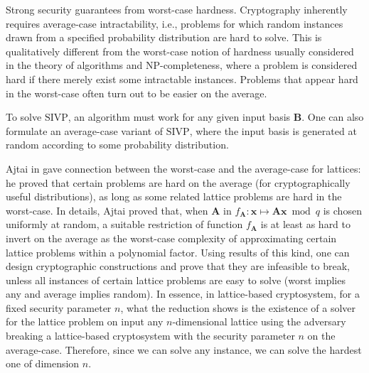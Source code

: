 Strong security guarantees from worst-case hardness. Cryptography inherently requires average-case intractability, i.e., problems for which random instances drawn from a specified probability distribution are hard to solve. This is qualitatively different from the worst-case notion of hardness usually considered in the theory of algorithms and NP-completeness, where a problem is considered hard if there merely exist some intractable instances. Problems that appear hard in the worst-case often turn out to be easier on the average.


\begin{plain}
\normalfont
To solve $\mathrm{SIVP}$, an algorithm must work for any given input basis $\textbf{B}$. One can also formulate an average-case variant of $\mathrm{SIVP}$, where the input basis is generated at random according to some probability distribution.
\end{plain}










Ajtai in \cite{ajtai1996generating} gave connection between the worst-case and the average-case for lattices: he proved that certain problems are hard on the average (for cryptographically useful distributions), as long as some related lattice problems are hard in the worst-case. In details, Ajtai proved that, when $\textbf{A}$ in $f_\textbf{A}:\textbf{x} \mapsto \textbf{A}\textbf{x} \bmod q$ is chosen uniformly at random, a suitable restriction of function $f_\textbf{A}$ is at least as hard to invert on the average as the worst-case complexity of approximating certain lattice problems within a polynomial factor. Using results of this kind, one can design cryptographic constructions and prove that they are infeasible to break, unless all instances of certain lattice problems are easy to solve (worst implies any and average implies random). In essence, in lattice-based cryptosystem, for a fixed security parameter $n$, what the reduction shows is the existence of a solver for the lattice problem on input any $n$-dimensional lattice using the adversary breaking a lattice-based cryptosystem with the security parameter $n$ on the average-case. Therefore, since we can solve any instance, we can solve the hardest one of dimension $n$.

